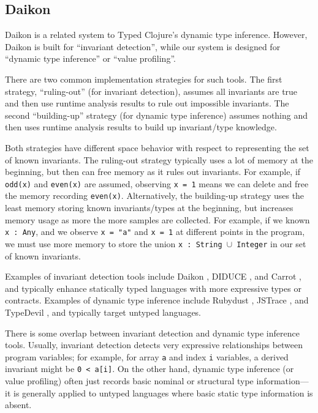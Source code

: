 \subsection{Daikon}

Daikon is a related system to Typed Clojure's dynamic type inference.
However, Daikon is built for ``invariant detection'', while our system
is designed for ``dynamic type inference'' or ``value profiling''.

There are two common implementation strategies for such tools. The first
strategy, ``ruling-out'' (for invariant detection), assumes all invariants are true 
and then use runtime analysis results to rule out
impossible invariants. The second ``building-up'' strategy (for dynamic type inference)
assumes nothing and then uses runtime analysis results to build up invariant/type knowledge.

Both strategies have different space behavior with respect to representing
the set of known invariants.
The ruling-out strategy typically uses a lot of memory at the beginning,
but then can free memory as it rules out invariants. For example, if
\texttt{odd(x)} and \texttt{even(x)} are assumed, observing \texttt{x = 1}
means we can delete and free the memory recording \texttt{even(x)}.
Alternatively, the building-up strategy uses the least memory storing
known invariants/types at the beginning, but increases memory usage
as more the more samples are collected. For example, if we known
\texttt{x : Any}, and we observe \texttt{x = "a"} and \texttt{x = 1}
at different points in the program, we must use more memory to
store the union \texttt{x : String $\cup$ Integer} in our set of known invariants.

Examples of invariant detection tools include Daikon \cite{Ernst06thedaikon},
DIDUCE \cite{hangal2002tracking}, and Carrot \cite{pytlik2003automated}, and
typically enhance statically typed languages with more expressive types or contracts.
Examples of dynamic type inference include Rubydust \cite{An10dynamicinference},
JSTrace \cite{saftoiu2010jstrace}, and TypeDevil \cite{pradel2015typedevil},
and typically target untyped languages.

There is some overlap between invariant detection and dynamic type inference
tools. Usually, invariant detection detects very expressive relationships
between program variables; for example, for array \texttt{a} and index
\texttt{i} variables, a derived invariant might be \texttt{0 < a[i]}.
On the other hand, dynamic type inference (or value profiling) often just records
basic nominal or structural type information---it is generally applied to untyped
languages where basic static type information is absent.

